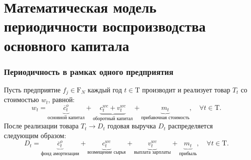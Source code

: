 \chapter{Математическая модель периодичности воспроизводства основного капитала}
\label{app:model}

\subsection{Периодичность в рамках одного предприятия}
Пусть предприятие $f_{j} \in \mathrm{F}_{N}$ каждый год $t \in \mathrm{T}$ производит и реализует товар $T_{t}$ со стоимостью $w_{t}$, равной:
\begin{equation}
    w_t = \underbrace{\overline{c}^o_t}_{\text{основной капитал}} + \underbrace{c^{wc}_t + v^{wc}_t}_{\text{оборотный капитал}} + \underbrace{m_t}_{\text{прибавочная стоимость}}, \quad \forall t \in \mathrm{T}.
\end{equation}
После реализации товара $T_{t} \rightarrow D_{t}$ годовая выручка $D_{t}$ распределяется следующим образом:
\begin{equation}D_t = \underbrace{\overline{c}^o_t}_{\text{фонд амортизации}} + \underbrace{c^{wc}_t}_{\text{возмещение сырья}} + \underbrace{v^{wc}_t}_{\text{выплата зарплаты}} + \underbrace{m_t}_{\text{прибыль}}, \quad \forall t \in \mathrm{T}.\end{equation}

